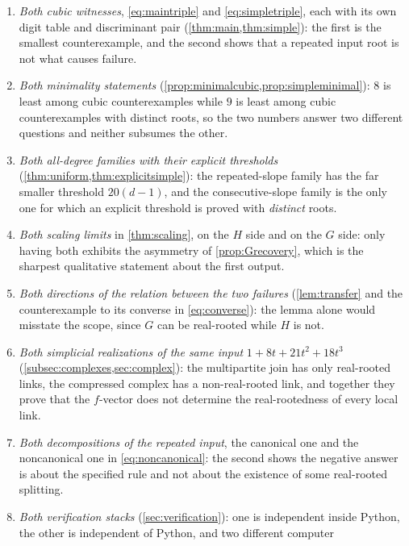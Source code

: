 \documentclass[11pt,letterpaper]{article}
\numberwithin{equation}{section}
\theoremstyle{definition}
\theoremstyle{remark}
\begin{document}
\begin{enumerate}[label=P\arabic*.,leftmargin=3.2em]
\item\label{pair:witness}
 \emph{Both cubic witnesses}, \eqref{eq:maintriple} and
 \eqref{eq:simpletriple}, each with its own digit table and discriminant pair
 (\cref{thm:main,thm:simple}): the first is the smallest counterexample,
 and the second shows that a repeated input root is not what causes failure.
\item\label{pair:minimal}
 \emph{Both minimality statements}
 (\cref{prop:minimalcubic,prop:simpleminimal}): $8$ is least among cubic
 counterexamples while $9$ is least among cubic counterexamples with distinct
 roots, so the two numbers answer two different questions and neither
 subsumes the other.
\item\label{pair:threshold}
 \emph{Both all-degree families with their explicit thresholds}
 (\cref{thm:uniform,thm:explicitsimple}): the repeated-slope family has the
 far smaller threshold $20(d-1)$, and the consecutive-slope family is the only
 one for which an explicit threshold is proved with \emph{distinct} roots.
\item\label{pair:limit}
 \emph{Both scaling limits} in \cref{thm:scaling}, on the $H$ side and on the
 $G$ side: only having both exhibits the asymmetry of
 \cref{prop:Grecovery}, which is the sharpest qualitative statement about the
 first output.
\item\label{pair:transfer}
 \emph{Both directions of the relation between the two failures}
 (\cref{lem:transfer} and the counterexample to its converse in
 \eqref{eq:converse}): the lemma alone would misstate the scope, since $G$ can
 be real-rooted while $H$ is not.
\item\label{pair:complex}
 \emph{Both simplicial realizations of the same input} $1+8t+21t^2+18t^3$
 (\cref{subsec:complexes,sec:complex}): the multipartite join has only
 real-rooted links, the compressed complex has a non-real-rooted link, and
 together they prove that the $f$-vector does not determine the
 real-rootedness of every local link.
\item\label{pair:split}
 \emph{Both decompositions of the repeated input}, the canonical one and the
 noncanonical one in \eqref{eq:noncanonical}: the second shows the negative
 answer is about the specified rule and not about the existence of some
 real-rooted splitting.
\item\label{pair:verify}
 \emph{Both verification stacks} (\cref{sec:verification}): one is independent
 inside Python, the other is independent of Python, and two different computer

\end{enumerate}
\end{document}
